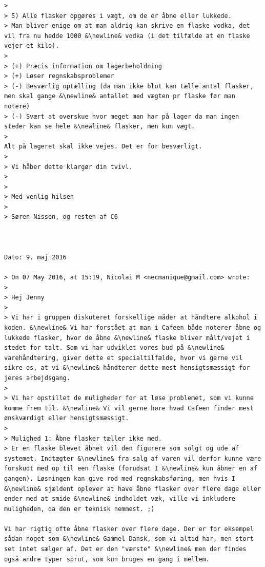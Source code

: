 \documentclass[]{article}
\begin{document}
\begin{lstlisting}[language=Gmail]
> 
> 5) Alle flasker opgøres i vægt, om de er åbne eller lukkede. 
> Man bliver enige om at man aldrig kan skrive en flaske vodka, det vil fra nu hedde 1000 &\newline& vodka (i det tilfælde at en flaske vejer et kilo).
> 
> (+) Præcis information om lagerbeholdning
> (+) Løser regnskabsproblemer
> (-) Besværlig optælling (da man ikke blot kan tælle antal flasker, men skal gange &\newline& antallet med vægten pr flaske før man notere)
> (-) Svært at overskue hvor meget man har på lager da man ingen steder kan se hele &\newline& flasker, men kun vægt. 
>
Alt på lageret skal ikke vejes. Det er for besværligt. 
>
> Vi håber dette klargør din tvivl. 
>
>
> Med venlig hilsen 
>
> Søren Nissen, og resten af C6



Dato: 9. maj 2016

> On 07 May 2016, at 15:19, Nicolai M <necmanique@gmail.com> wrote:
>
> Hej Jenny
>
> Vi har i gruppen diskuteret forskellige måder at håndtere alkohol i koden. &\newline& Vi har forstået at man i Cafeen både noterer åbne og lukkede flasker, hvor de åbne &\newline& flaske bliver målt/vejet i stedet for talt. Som vi har udviklet vores bud på &\newline& varehåndtering, giver dette et specialtilfælde, hvor vi gerne vil sikre os, at vi &\newline& håndterer dette mest hensigtsmæssigt for jeres arbejdsgang.
>
> Vi har opstillet de muligheder for at løse problemet, som vi kunne komme frem til. &\newline& Vi vil gerne høre hvad Cafeen finder mest ønskværdigt eller hensigtsmæssigt.
>
> Mulighed 1: Åbne flasker tæller ikke med.
> Er en flaske blevet åbnet vil den figurere som solgt og ude af systemet. Indtægter &\newline& fra salg af varen vil derfor kunne være forskudt med op til een flaske (forudsat I &\newline& kun åbner en af gangen). Løsningen kan give rod med regnskabsføring, men hvis I &\newline& sjældent oplever at have åbne flasker over flere dage eller ender med at smide &\newline& indholdet væk, ville vi inkludere muligheden, da den er teknisk nemmest. ;)

Vi har rigtig ofte åbne flasker over flere dage. Der er for eksempel sådan noget som &\newline& Gammel Dansk, som vi altid har, men stort set intet sælger af. Det er den "værste" &\newline& men der findes også andre typer sprut, som kun bruges en gang i mellem.


\end{lstlisting}
\end{document}
